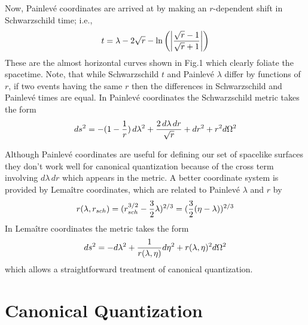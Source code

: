 \documentclass[12pt]{article}
\begin{document}
Now, Painlev\'e coordinates are arrived at by making an $r$-dependent shift in
Schwarzschild time; i.e.,
\begin{equation}
 t = \lambda - 2\sqrt{r} - \ln\left(\left\vert{\sqrt{r} - 1 \over \sqrt{r} + 1}\right\vert\right)
\end{equation}
These are the almost horizontal curves shown in Fig.1 which clearly foliate
the spacetime. Note, that while Schwarzschild $t$ and Painlev\'e $\lambda$
differ by functions of $r$, if two events having the same $r$ then the differences in
Schwarzschild and Painlev\'e times are equal.
In Painlev\'e coordinates the Schwarzschild metric takes the form
\begin{equation}
ds^2 = -(1 - {1 \over r}) \,d\lambda^2 + {2\,d\lambda\,dr \over \sqrt{r}} + dr^2 +  r^2 d\Omega^2
\end{equation}
\epsfverbosetrue
\begin{figure}
\begin{center}
\leavevmode
\vskip 1in
\end{center}
\vskip -1.75in
\caption[kruskaletc]{}
\label{kruskal}
\end{figure}
Although Painlev\'e coordinates are useful for defining our set of spacelike surfaces
they don't work well for canonical quantization because of the cross term
involving $d\lambda\,dr$ which appears in the metric.  A better coordinate system
is provided by Lema\^itre coordinates, which are related to Painlev\'e $\lambda$ and $r$ by
\begin{equation}
	r(\lambda,r_{sch}) = (r_{sch}^{3/2} - {3\over 2}\lambda)^{2/3}
	= ({3\over 2} (\eta - \lambda))^{2/3}
\end{equation}
In Lema\^itre coordinates the metric takes the form
\begin{equation}
ds^2 = - d\lambda^2 + {1\over r(\lambda,\eta)} d\eta^2 + r(\lambda,\eta)^2 d\Omega^2
\end{equation}
which allows a straightforward treatment of canonical quantization.

\section{Canonical Quantization}
\end{document}
